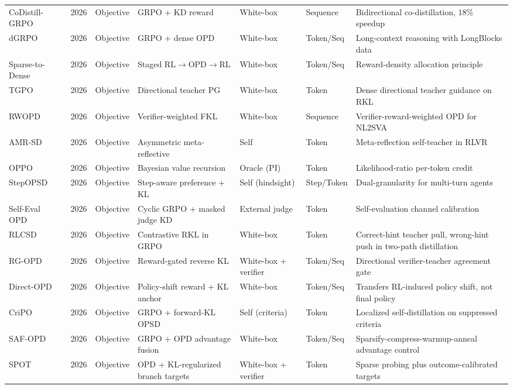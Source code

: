 \documentclass{article} %
\begin{document}
\begin{table}[t]
{\begin{tabular}{@{}lclllll@{}}
        CoDistill-GRPO~\citep{2605.08873} & 2026 & Objective & GRPO + KD reward & White-box & Sequence & Bidirectional co-distillation, 18\% speedup \\
        dGRPO~\citep{2605.12227} & 2026 & Objective & GRPO + dense OPD & White-box & Token/Seq & Long-context reasoning with LongBlocks data \\
        Sparse-to-Dense~\citep{2605.12483} & 2026 & Objective & Staged RL$\to$OPD$\to$RL & White-box & Token/Seq & Reward-density allocation principle \\
        TGPO~\citep{2605.13230} & 2026 & Objective & Directional teacher PG & White-box & Token & Dense directional teacher guidance on RKL \\
        RWOPD~\citep{2605.13501} & 2026 & Objective & Verifier-weighted FKL & White-box & Sequence & Verifier-reward-weighted OPD for NL2SVA \\
        AMR-SD~\citep{2605.18529} & 2026 & Objective & Asymmetric meta-reflective & Self & Token & Meta-reflection self-teacher in RLVR \\
        OPPO~\citep{2605.21851} & 2026 & Objective & Bayesian value recursion & Oracle (PI) & Token & Likelihood-ratio per-token credit \\
        StepOPSD~\citep{2605.27140} & 2026 & Objective & Step-aware preference + KL & Self (hindsight) & Step/Token & Dual-granularity for multi-turn agents \\
        Self-Eval OPD~\citep{2606.05122} & 2026 & Objective & Cyclic GRPO + masked judge KD & External judge & Token & Self-evaluation channel calibration \\
        RLCSD~\citep{2606.11709} & 2026 & Objective & Contrastive RKL in GRPO & White-box & Token & Correct-hint teacher pull, wrong-hint push in two-path distillation \\
        RG-OPD~\citep{2607.04037} & 2026 & Objective & Reward-gated reverse KL & White-box + verifier & Token/Seq & Directional verifier-teacher agreement gate \\
        Direct-OPD~\citep{2607.05394} & 2026 & Objective & Policy-shift reward + KL anchor & White-box & Token/Seq & Transfers RL-induced policy shift, not final policy \\
        CriPO~\citep{2607.18082} & 2026 & Objective & GRPO + forward-KL OPSD & Self (criteria) & Token & Localized self-distillation on suppressed criteria \\
        SAF-OPD~\citep{2607.29209} & 2026 & Objective & GRPO + OPD advantage fusion & White-box & Token/Seq & Sparsify-compress-warmup-anneal advantage control \\
        SPOT~\citep{2608.04419} & 2026 & Objective & OPD + KL-regularized branch targets & White-box + verifier & Token & Sparse probing plus outcome-calibrated targets \\
        \bottomrule
    \end{tabular}
    }
\end{table}
\end{document}
